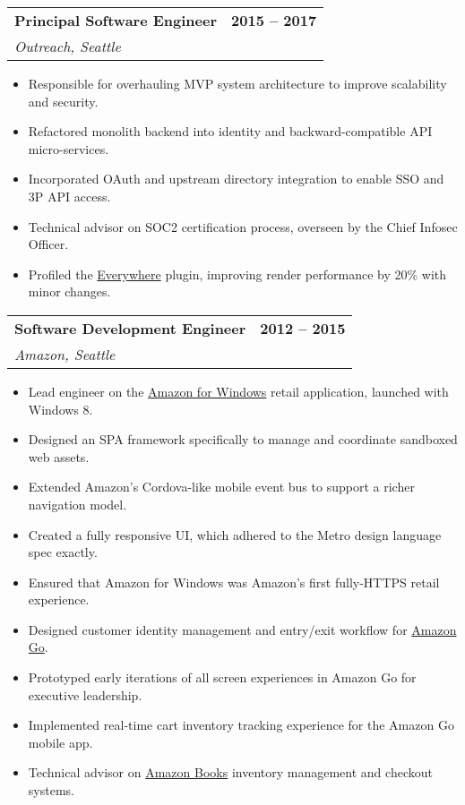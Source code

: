 \documentclass[12pt]{article}
\makeatletter
\newenvironment{justifycolumns}
{\begin{tabular*}{\textwidth}{@{\extracolsep{\fill}}lr@{}}}
{\end{tabular*}}
\newcommand{\row}[2]{#1 & #2 \\}
\newcommand{\rowheading}[2]{\row{\textbf{#1}}{\textbf{#2}}}
\newcommand{\range}[2]{#1 -- #2}
\newcommand{\blockseparation}{\vspace{0.15in}}
\newenvironment{tightbullets}
{\begin{itemize}}
{\end{itemize}}
\newenvironment{bullets}
{\begin{tightbullets}}
{\end{tightbullets} \blockseparation}
\makeatother
\begin{document}
\begin{flushleft}
\begin{justifycolumns}
	\rowheading{Principal Software Engineer}{\range{2015}{2017}}
	\row{\emph{Outreach, Seattle}}{}
\end{justifycolumns}
\begin{bullets}
	\item Responsible for overhauling MVP system architecture to improve scalability and security.
	\item Refactored monolith backend into identity and backward-compatible API micro-services.
	\item Incorporated OAuth and upstream directory integration to enable SSO and 3P API access.
	\item Technical advisor on SOC2 certification process, overseen by the Chief Infosec Officer.
	\item Profiled the \href{https://chrome.google.com/webstore/detail/outreach-everywhere/chmpifjjfpeodjljjadlobceoiflhdid}{Everywhere} plugin, improving render performance by 20\% with minor changes.
\end{bullets}

\begin{justifycolumns}
	\rowheading{Software Development Engineer}{\range{2012}{2015}}
	\row{\emph{Amazon, Seattle}}{}
\end{justifycolumns}
\begin{bullets}
	\item Lead engineer on the \href{http://apps.microsoft.com/windows/en-us/app/amazon/80299018-3dee-418d-8466-374fe9463309}{Amazon for Windows} retail application, launched with Windows 8.
	\item Designed an SPA framework specifically to manage and coordinate sandboxed web assets.
	\item Extended Amazon’s Cordova-like mobile event bus to support a richer navigation model.
	\item Created a fully responsive UI, which adhered to the Metro design language spec exactly.
	\item Ensured that Amazon for Windows was Amazon's first fully-HTTPS retail experience.
	\item Designed customer identity management and entry/exit workflow for \href{https://www.amazon.com/b?ie=UTF8\&node=16008589011}{Amazon Go}.
	\item Prototyped early iterations of all screen experiences in Amazon Go for executive leadership.
	\item Implemented real-time cart inventory tracking experience for the Amazon Go mobile app.
	\item Technical advisor on \href{https://www.amazon.com/amazon-books-university-village-seattle-washington/b?ie=UTF8\&node=17750359011}{Amazon Books} inventory management and checkout systems.
\end{bullets}


\end{flushleft}
\end{document}
